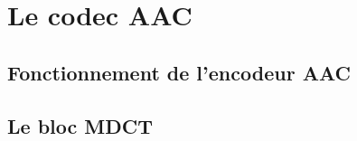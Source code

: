 \documentclass{article}
\begin{document}
    \newpage
    \section{Le codec AAC}
    \label{sec:AAC}
    \subsection{Fonctionnement de l'encodeur AAC}









    \subsection{Le bloc MDCT}
\end{document}
